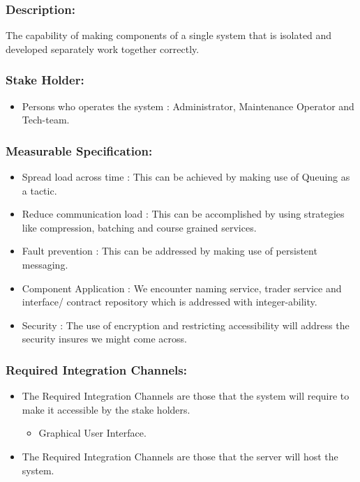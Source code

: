 \documentclass[11pt]{article}
\begin{document}
		\subsubsection{Description:}
			\textbf{}The capability of making components of a single system that is isolated and developed separately work together correctly.
		
		\subsubsection{Stake Holder:}
			\begin{itemize}
				\item Persons who operates the system : Administrator, Maintenance Operator and Tech-team.
			\end{itemize}
				
		\subsubsection{Measurable Specification:}
			
			\begin{itemize}			
			
				\item Spread load across time : This can be achieved by making use of Queuing as a tactic.
				\item Reduce communication load : This can be accomplished by using strategies like compression, batching and course grained services.
				\item  Fault prevention : This can be addressed by making use of persistent messaging.
				\item Component Application  : We encounter naming service, trader service and interface/ contract repository which is addressed with integer-ability.
				\item  Security : The use of encryption and restricting accessibility will address the security insures we might come across.
			
			\end{itemize}
			
			\subsubsection{Required Integration Channels:}
			\begin{itemize}			
			
				\item The Required Integration Channels are those that the system will require to make it accessible by the stake holders.
				\begin{itemize}			
			
					\item Graphical User Interface.
				
				\end{itemize}	
			
				\item The Required Integration Channels are those that the server will host the system.
			\end{itemize}	
\end{document}
